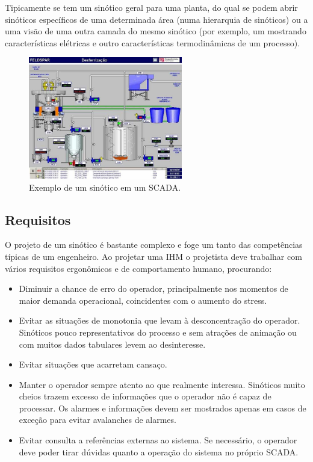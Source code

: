 Tipicamente se tem um sinótico geral para uma planta, do qual se podem abrir sinóticos específicos de uma determinada área (numa hierarquia de sinóticos) ou a uma visão de uma outra camada do mesmo sinótico (por exemplo, um mostrando características elétricas e outro características termodinâmicas de um processo).

\begin{figure}[hb]
  \centering
  \includegraphics[width=0.6\textwidth]{figuras/sinotico_feldspar}
  \caption{Exemplo de um sinótico em um SCADA.}\label{fig:sinotico_feldspar}
\end{figure}


\subsection{Requisitos}
\label{sub:Requisitos}

O projeto de um sinótico é bastante complexo e foge um tanto das competências típicas de um engenheiro. Ao projetar uma IHM o projetista deve trabalhar com vários requisitos ergonômicos e de comportamento humano, procurando:

\begin{itemize}
	\item Diminuir a chance de erro do operador, principalmente nos
	momentos de maior demanda operacional, coincidentes com o aumento
	do stress.
	\item Evitar as situações de monotonia que levam à desconcentração do
	operador. Sinóticos pouco representativos do processo e sem atrações
	de animação ou com muitos dados tabulares levem ao desinteresse.
	\item Evitar situações que acarretam cansaço.
	\item Manter o operador sempre atento ao que realmente interessa. Sinóticos muito cheios trazem
	excesso de informações que o operador não é capaz de processar. Os
	alarmes e informações devem ser mostrados apenas em casos de exceção para evitar avalanches de alarmes.
	\item Evitar consulta a referências externas ao sistema. Se necessário, o operador deve poder	tirar dúvidas quanto a operação do sistema no próprio SCADA.

\end{itemize}

